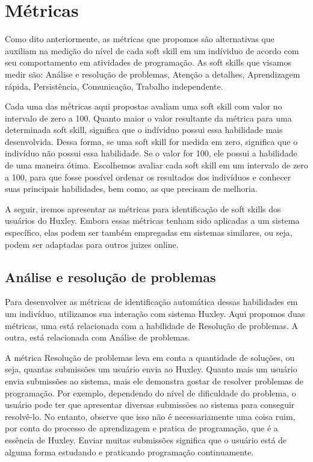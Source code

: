 \section{Métricas} 
\label{sec:metrics}

Como dito anteriormente, as métricas que propomos são alternativas que auxiliam na medição do nível de cada soft skill em um indíviduo de acordo com seu comportamento em atividades de programação. As soft skills que visamos medir são: Análise e resolução de problemas, Atenção a detalhes, Aprendizagem rápida, Persistência, Comunicação, Trabalho independente.

Cada uma das métricas aqui propostas avaliam uma soft skill com valor no intervalo de zero a 100. Quanto maior o valor resultante da métrica para uma determinada soft skill, significa que o indíviduo possui essa habilidade mais desenvolvida. Dessa forma, se uma soft skill for medida em zero, significa que o indivíduo não possui essa habilidade. Se o valor for 100, ele possui a habilidade de uma maneira ótima. Escolhemos avaliar cada soft skill em um intervalo de zero a 100, para que fosse possível ordenar os resultados dos indivíduos e conhecer suas principais habilidades, bem como, as que precisam de melhoria.

A seguir, iremos apresentar as métricas para identificação de soft skills dos usuários do Huxley. Embora essas métricas tenham sido aplicadas a um sistema específico, elas podem ser também empregadas em sistemas similares, ou seja, podem ser adaptadas para outros juizes online.

\subsection{Análise e resolução de problemas}

Para desenvolver as métricas de identificação automática dessas habilidades em um indivíduo, utilizamos sua interação com sistema Huxley. Aqui propomos duas métricas, uma está relacionada com a habilidade de Resolução de problemas. A outra, está relacionada com Análise de problemas.

A métrica Resolução de problemas leva em conta a quantidade de soluções, ou seja, quantas submissões um usuário envia ao Huxley. Quanto mais um usuário envia submissões ao sistema, mais ele demonstra gostar de resolver problemas de programação. Por exemplo, dependendo do nível de dificuldade do problema, o usuário pode ter que apresentar diversas submissões ao sistema para conseguir resolvê-lo. No entanto, observe que isso não é necessariamente uma coisa ruim, por conta do processo de aprendizagem e pratica de programação, que é a essência de Huxley. Enviar muitas submissões significa que o usuário está de alguma forma estudando e praticando programação continuamente.

